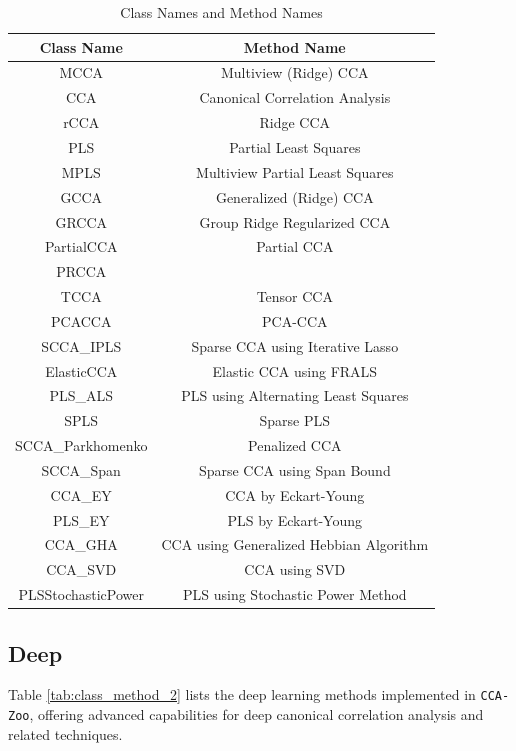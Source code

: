 \begin{table}[ht]
    \centering
    \begin{tabular}{|c|c|}
        \hline
        Class Name & Method Name \\
        \hline
        MCCA & Multiview (Ridge) CCA\citep{rupnik2010multi} \\
        CCA & Canonical Correlation Analysis\citep{hotelling1992relations} \\
        rCCA & Ridge CCA\citep{vinod1976canonical} \\
        PLS & Partial Least Squares\cite{wold1975path} \\
        MPLS & Multiview Partial Least Squares \\
        GCCA & Generalized (Ridge) CCA\citep{carroll1968generalization, tenenhaus2011regularized} \\
        GRCCA & Group Ridge Regularized CCA\citep{tuzhilina2023canonical} \\
        PartialCCA & Partial CCA\citep{rotman2018bridging} \\
        PRCCA &  \citep{tuzhilina2023canonical}\\
        TCCA & Tensor CCA\citep{kim2007tensor} \\
        PCACCA & PCA-CCA\citep{mihali} \\
        SCCA\_IPLS & Sparse CCA using Iterative Lasso \\
        ElasticCCA & Elastic CCA using FRALS \\
        PLS\_ALS & PLS using Alternating Least Squares \\
        SPLS & Sparse PLS \\
        SCCA\_Parkhomenko & Penalized CCA \\
        SCCA\_Span & Sparse CCA using Span Bound \\
        CCA\_EY & CCA by Eckart-Young \\
        PLS\_EY & PLS by Eckart-Young \\
        CCA\_GHA & CCA using Generalized Hebbian Algorithm \\
        CCA\_SVD & CCA using SVD \\
        PLSStochasticPower & PLS using Stochastic Power Method \\
        \hline
    \end{tabular}
    \caption{Class Names and Method Names}
    \label{tab:class_method}
\end{table}


\subsection{Deep}
Table \ref{tab:class_method_2} lists the deep learning methods implemented in \texttt{CCA-Zoo}, offering advanced capabilities for deep canonical correlation analysis and related techniques.

